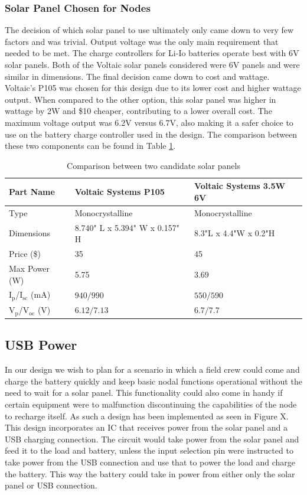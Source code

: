 \subsubsection{Solar Panel Chosen for Nodes}
The decision of which solar panel to use ultimately only came down to very few factors and was trivial. Output voltage was the only main requirement that needed to be met. The charge controllers for Li-Io batteries operate best with 6V solar panels. Both of the Voltaic solar panels considered were 6V panels and were similar in dimensions. The final decision came down to cost and wattage. Voltaic's P105 was chosen for this design due to its lower cost and higher wattage output. When compared to the other option, this solar panel was higher in wattage by 2W and \$10 cheaper, contributing to a lower overall cost. The maximum voltage output was 6.2V versus 6.7V, also making it a safer choice to use on the battery charge controller used in the design. The comparison between these two components can be found in Table \ref{tab:solar-panel-part-comparison}.

\begin{table}
\centering
\caption{Comparison between two candidate solar panels}
\begin{tabular}{|l|l|l|}
\hline
Part Name & Voltaic Systems P105 & Voltaic Systems 3.5W 6V \\
\hline\hline
Type & Monocrystalline & Monocrystalline \\\hline
Dimensions & 8.740" L x 5.394" W x 0.157" H & 8.3"L x 4.4"W x 0.2"H \\\hline
Price (\$) & 35 & 45 \\\hline
Max Power (W) & 5.75 & 3.69 \\\hline
I$_{\text{p}}$/I$_{\text{sc}}$ (mA) & $940/990$ & $550/590$ \\\hline
V$_{\text{p}}$/V$_{\text{oc}}$ (V) & $6.12/7.13$ & $6.7/7.7$ \\\hline
\end{tabular}
\label{tab:solar-panel-part-comparison}
\end{table}

\subsection{USB Power}
In our design we wish to plan for a scenario in which a field crew could come and charge the battery quickly and keep basic nodal functions operational without the need to wait for a solar panel. This functionality could also come in handy if certain equipment were to malfunction discontinuing the capabilities of the node to recharge itself. As such a design has been implemented as seen in Figure X. This design incorporates an IC that receives power from the solar panel and a USB charging connection. The circuit would take power from the solar panel and feed it to the load and battery, unless the input selection pin were instructed to take power from the USB connection and use that to power the load and charge the battery. This way the battery could take in power from either only the solar panel or USB connection.
